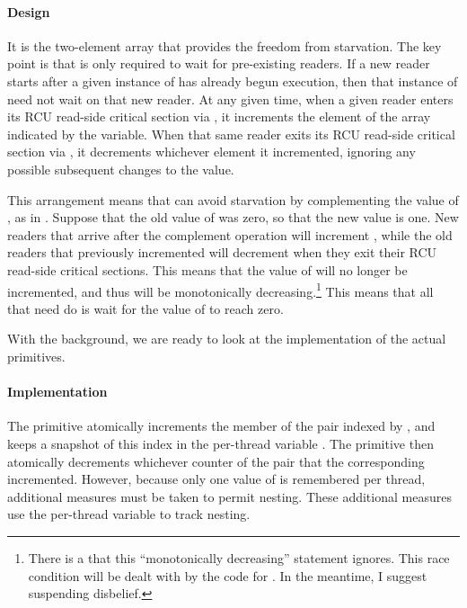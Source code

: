 \paragraph{Design}

It is the two-element  array that provides the freedom
from starvation.
The key point is that  is only required to wait
for pre-existing readers.
If a new reader starts after a given instance of 
has already begun execution, then that instance of 
need not wait on that new reader.
At any given time, when a given reader enters its RCU read-side critical
section via ,
it increments the element of the  array indicated by
the  variable.
When that same reader exits its RCU read-side critical section via
, it decrements whichever element it incremented,
ignoring any possible subsequent changes to the  value.

This arrangement means that  can avoid starvation
by complementing the value of , as in .
Suppose that the old value of  was zero, so that the new
value is one.
New readers that arrive after the complement operation will increment
, while the old readers that previously incremented
 will decrement  when they exit their
RCU read-side critical sections.
This means that the value of  will no longer be incremented,
and thus will be monotonically decreasing.\footnote{
	There is a  that this ``monotonically decreasing''
	statement ignores.
	This race condition will be dealt with by the code for
	.
	In the meantime, I suggest suspending disbelief.}
This means that all that  need do is wait for the
value of  to reach zero.

With the background, we are ready to look at the implementation of the
actual primitives.

\paragraph{Implementation}

The  primitive atomically increments the member of the
 pair indexed by , and keeps a
snapshot of this index in the per-thread variable .
The  primitive then atomically decrements
whichever counter of the pair that the corresponding 
incremented.
However, because only one value of  is remembered per thread,
additional measures must be taken to permit nesting.
These additional measures use the per-thread  variable
to track nesting.

